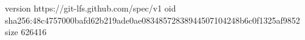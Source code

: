 version https://git-lfs.github.com/spec/v1
oid sha256:48c4757000bafd62b219ade0ae08348572838944507104248b6c0f1325af9852
size 626416
